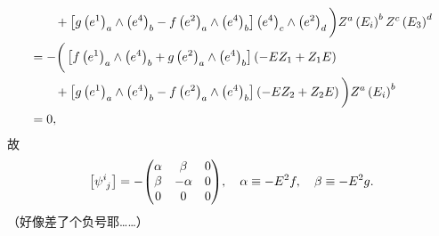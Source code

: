 \begin{xiti}
\begin{zm}
\begin{align*}
			&\qquad {}+ \left[ g \tensor{\left( e^1 \right)}{_a} \wedge \tensor{\left( e^4 \right)}{_b} - f \tensor{\left( e^2 \right)}{_a} \wedge \tensor{\left( e^4 \right)}{_b} \right] \tensor{\left( e^4 \right)}{_c} \wedge \tensor{\left( e^2 \right)}{_d} \bigg) \tensor{Z}{^a} \tensor{\left( E_i \right)}{^b} \tensor{Z}{^c} \tensor{\left( E_3 \right)}{^d}\\
			&= - \bigg( \left[ f \tensor{\left( e^1 \right)}{_a} \wedge \tensor{\left( e^4 \right)}{_b} + g \tensor{\left( e^2 \right)}{_a} \wedge \tensor{\left( e^4 \right)}{_b} \right] \left( - E Z_1 + Z_1 E \right)\\
			&\qquad {} + \left[ g \tensor{\left( e^1 \right)}{_a} \wedge \tensor{\left( e^4 \right)}{_b} - f \tensor{\left( e^2 \right)}{_a} \wedge \tensor{\left( e^4 \right)}{_b} \right] \left( - E Z_2 + Z_2 E \right) \bigg) \tensor{Z}{^a} \tensor{\left( E_i \right)}{^b}\\
			&= 0,
		\end{align*}
		故
		\begin{equation*}
			\left[ \tensor{\psi}{^i_j} \right] = - \mqty(
				\alpha & \beta & 0 \\
				\beta & -\alpha & 0\\
				0 & 0 & 0
			)
			\qc \alpha \equiv - E^2 f \qc \beta \equiv - E^2 g.
		\end{equation*}
		（好像差了个负号耶……）
	\end{zm}
\end{xiti}